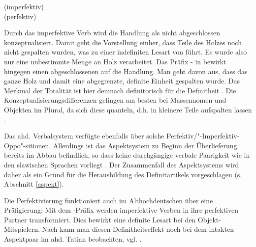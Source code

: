 \begin{exe}
	\ex \label{ex:russ-aspekt}   
	\begin{xlist}
		\ex \label{ex:russ-imper}  (imperfektiv) \\ 
		\ex \label{ex:russ-per}  (perfektiv) \\ 
		\end{xlist}
\end{exe}
\noindent
Durch das imperfektive Verb  wird die Handlung als nicht abgeschlossen konzeptualisiert. Damit  geht die Vorstellung einher, dass Teile des Holzes noch nicht gespalten wurden, was zu einer indefiniten Lesart von   führt. Es wurde also nur eine unbestimmte Menge an Holz verarbeitet. Das Präfix - in  bewirkt hingegen einen abgeschlossenen   auf die Handlung. Man geht davon aus, dass das ganze Holz und damit eine abgegrenzte, definite Einheit gespalten wurde.
Das Merkmal der Totalität ist hier demnach definitorisch für die Definitheit \parencite[14]{Leiss2000}. Die Konzeptualisierungsdifferenzen gelingen am besten bei Massennomen und Objekten im Plural, da sich diese quanteln, d.h. in kleinere Teile aufspalten lassen \parencite{Heindl2016}. 

Das ahd. Verbalsystem verfügte ebenfalls über solche Perfektiv/"-Imperfektiv-Oppo"-sitionen. Allerdings ist das Aspektsystem zu Beginn der Überlieferung bereits im Abbau befindlich, so dass keine durchgängige verbale Paarigkeit wie in den slawischen Sprachen vorliegt \parencite[3]{Eroms1997}. Der Zusammenfall des Aspektsystems wird daher als ein Grund für die Herausbildung des Definitartikels vorgeschlagen (s. Abschnitt \ref{aspekt}). 


Die Perfektivierung funktioniert auch im Althochdeutschen über eine Präfigierung: Mit dem -Präfix werden imperfektive Verben in ihre perfektiven Partner transformiert. Dies bewirkt eine definite Lesart bei den Objekt-Mitspielern. Nach \textcite[176-181]{Leiss2000} kann man diesen Definitheitseffekt noch bei dem intakten Aspektpaar  im ahd. Tatian beobachten, vgl. . 


